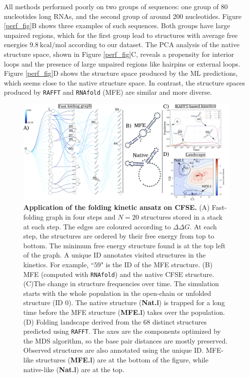 All methods performed poorly on two groups of sequences: one group of $80$ nucleotides long RNAs, and the second group of around $200$ nucleotides. Figure \ref{perf_fig}B shows three examples of such sequences. Both groups have large unpaired regions, which for the first group lead to structures with average free energies $9.8\ \textrm{kcal/mol}$ according to our dataset. The PCA analysis of the native structure space, shown in Figure \ref{perf_fig}C, reveals a propensity for interior loops and the presence of large unpaired regions like hairpins or external loops. Figure \ref{perf_fig}D shows the structure space produced by the ML predictions, which seems close to the native structure space. In contrast, the structure spaces produced by \texttt{RAFFT} and \texttt{RNAfold} (MFE) are similar and more diverse.

\begin{figure}[t!]
	\centering
	\includegraphics[width=0.9\linewidth]{../res/images/rafft/test_case.png}
	\caption{\label{test_case}\textbf{Application of the folding kinetic ansatz on CFSE.}  (A) Fast-folding graph in four steps and $N=20$ structures stored in a stack at each step. The edges are coloured according to \(\Delta \Delta G\). At each step, the structures are ordered by their free energy from top to bottom. The minimum free energy structure found is at the top left of the graph. A unique ID annotates visited structures in the kinetics. For example, ``$59$" is the ID of the MFE structure. (B) MFE (computed with \texttt{RNAfold}) and the native CFSE structure. (C)The change in structure frequencies over time. The simulation starts with the whole population in the open-chain or unfolded structure (ID 0). The native structure (\textbf{Nat.l}) is trapped for a long time before the MFE structure (\textbf{MFE.l}) takes over the population. (D) Folding landscape derived from the $68$ distinct structures predicted using \texttt{RAFFT}. The axes are the components optimized by the MDS algorithm, so the base pair distances are mostly preserved. Observed structures are also annotated using the unique ID. MFE-like structures (\textbf{MFE.l}) are at the bottom of the figure, while native-like (\textbf{Nat.l}) are at the top.}
\end{figure}
